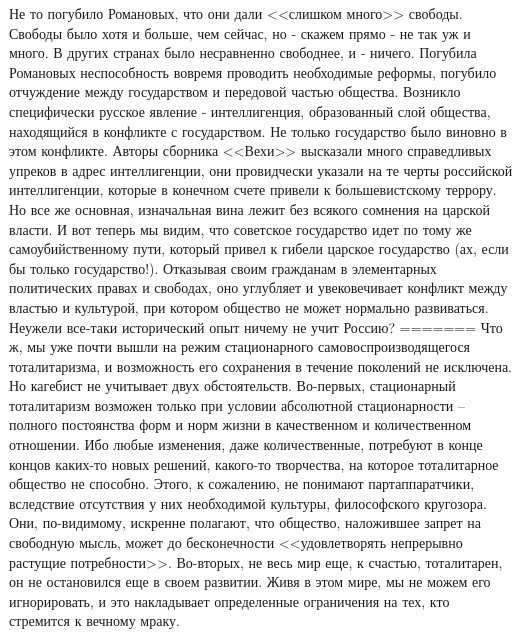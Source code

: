 \documentclass{book}
\begin{document}
Не то погубило Романовых, что они дали <<слишком много>> свободы. Свободы было хотя и больше, чем сейчас, но ‑ ска­жем прямо ‑ не так уж и много. В других странах было не­сравненно свободнее, и ‑ ничего. Погубила Романовых неспо­собность вовремя  проводить необходимые реформы, погуби­ло отчуждение между государством и передовой частью обще­ства. Возникло специфически русское явление ‑ интеллиген­ция, образованный слой общества, находящийся в конфликте с государством. Не только государство было виновно в этом конфликте. Авторы сборника <<Вехи>> высказали много спра­ведливых упреков в адрес интеллигенции, они провидчески указали на те черты российской интеллигенции, которые в ко­нечном счете привели к большевистскому террору. Но все же основная, изначальная вина лежит без всякого сомнения на царской власти. И вот теперь мы видим, что советское государство идет по тому же самоубийственному пути, который привел к гибели царское государство (ах, если бы только государство!). Отказывая своим гражданам в элементарных политических правах и свободах, оно углубляет и увековечивает конфликт между властью и культурой, при котором общество не может нормально развиваться. Неужели все‑таки исторический опыт ничему не учит Россию?
=======
Что ж, мы уже почти вышли на режим стационарного самовоспроизводящегося тоталитаризма, и возможность его сохранения в течение поколений не исключена. Но кагебист не учитывает двух обстоятельств. Во-первых, стационарный тоталитаризм возможен только при условии абсолютной  стационарности -- полного постоянства форм и норм жизни в качественном и количественном отношении. Ибо любые изменения, даже количественные, потребуют в конце концов каких-то новых решений, какого-то творчества, на которое тоталитарное общество не способно. Этого, к сожалению, не понимают партаппаратчики, вследствие отсутствия у них необходимой куль­туры, философского кругозора. Они, по-видимому, искренне полагают, что общество, наложившее запрет на свободную мысль, может до бесконечности <<удовлетворять непрерывно растущие потребности>>. Во-вторых, не весь мир еще, к счастью, тоталитарен, он не остановился еще в своем развитии. Живя в этом мире, мы не можем его игнорировать, и это накладывает определенные ограничения на тех, кто стремится к 
вечному мраку.
\end{document}
